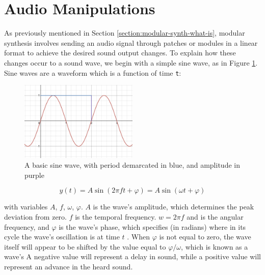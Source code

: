 \section{Audio Manipulations}
As previously mentioned in Section \ref{section:modular-synth-what-is}, modular synthesis involves sending an audio signal through patches or modules in a linear format to achieve the desired sound output changes. To explain how these changes occur to a sound wave, we begin with a simple sine wave, as in Figure \ref{fig:sine-wave-period-amplitude}. Sine waves are a waveform which is a function of time \texttt{t}:

\begin{figure}
	\centering
	\includegraphics[width=0.5\textwidth]{figures/sine-wave-period-amplitude.png}
	\caption{A basic sine wave, with period demarcated in blue, and amplitude in purple}
	\label{fig:sine-wave-period-amplitude}
\end{figure}

\begin{equation}\label{eq:full-sine-wave-equation}
	y(t) = A \sin(2\pi ft + \varphi) = A\sin(\omega t + \varphi)
\end{equation}

with variables $A$, $f$, $\omega$, $\varphi$. $A$ is the wave's amplitude, which determines the peak deviation from zero. $f$ is the temporal frequency. $w = 2\pi f$ and is the angular frequency, and $\varphi$ is the wave's phase, which specifies (in radians) where in its cycle the wave's oscillation is at time $t$ \cite{Kirk_Hunt_2013}. When $\varphi$ is not equal to zero, the wave itself will appear to be shifted by the value equal to $\varphi / \omega$, which is known as a wave's  A negative value will represent a delay in sound, while a positive value will represent an advance in the heard sound.

